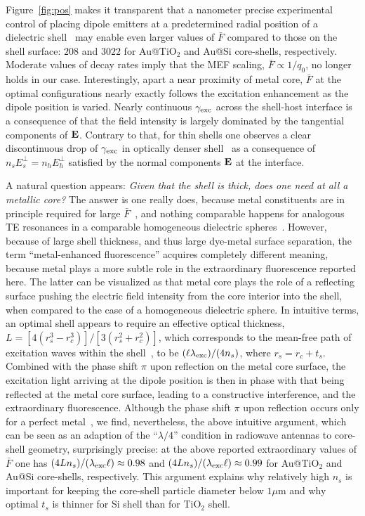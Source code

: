 \documentclass[9pt,twocolumn,twoside]{osajnl}
\newcommand{\vE}{{\bf E}}
\newcommand{\ld}{\lambda}
\begin{document}
Figure~\ref{fig:pos} makes it transparent that a nanometer precise experimental control of placing dipole emitters at a predetermined radial position of a dielectric shell~\cite{VanBlaaderen1992} may enable even larger values of $\bar F$ compared to those on the shell surface: $208$ and $3022$ for Au@TiO$_2$ and Au@Si core-shells, respectively. 
Moderate values of decay rates imply that the MEF scaling, $\bar F\propto 1/q_0$, no longer holds in our case. 
Interestingly, apart a near proximity of metal core, $\bar F$ at the optimal configurations nearly exactly follows the excitation enhancement as the dipole position is varied. 
Nearly continuous $\gamma_{\rm exc}$ across the shell-host interface is a consequence of that the field intensity is largely dominated by the tangential components of $\vE$. Contrary to that, for thin shells one observes a clear discontinuous drop of $\gamma_{\rm exc}$ in optically denser shell~\cite[Fig. S1]{Sun20JPCC} as a consequence of $n_s E_s^\perp=n_h E_h^\perp$ satisfied by the normal components $\vE$ at the interface. 

A natural question appears: {\em Given that the shell is thick, does one need at all a metallic core?} The answer is one really does, because metal constituents are in principle required for large $\bar F$~\cite{Bozhevolnyi2016}, and nothing comparable happens for analogous TE resonances in a comparable homogeneous dielectric spheres~\cite{DeDood2001a}. 
However, because of large shell thickness, and thus large dye-metal surface separation,
the term ``metal-enhanced fluorescence'' acquires completely different meaning, because metal plays a more subtle role in the extraordinary fluorescence reported here. 
The latter can be visualized as that metal core plays the role of a reflecting surface pushing the electric field intensity from the core interior into the shell, when compared to the case of a homogeneous dielectric sphere. 
In intuitive terms, an optimal shell appears to require an effective optical thickness, $L=[4(r_s^3 - r_c^3)] /[3(r_s^2 + r_c^2)]$, which corresponds to the mean-free path of excitation waves within the shell~\cite{Moroz2008}, to be $(\ell \ld_{\rm exc})/(4n_s)$, where $r_s = r_c + t_s$.
Combined with the phase shift $\pi$ upon reflection on the metal core surface, the excitation light arriving at the dipole position is then in phase with that being reflected at the metal core surface, leading to a constructive interference, and the extraordinary fluorescence.
Although the phase shift $\pi$ upon reflection occurs only for a perfect metal~\cite{Doi1997}, we find, nevertheless, the above intuitive argument, which can be seen as an adaption of the ``$\ld/4$'' condition in radiowave antennas to core-shell geometry, surprisingly precise: at the above reported extraordinary values of $\bar F$ one has $(4Ln_s)/(\ld_{\rm exc}\ell) \approx 0.98$ and $(4Ln_s)/(\ld_{\rm exc}\ell) \approx 0.99$ for Au@TiO$_2$ and Au@Si core-shells, respectively.
This argument explains why relatively high $n_s$ is important for keeping the core-shell particle diameter below $1 \mu$m and why optimal $t_s$ is thinner for Si shell than for TiO$_2$ shell.
\end{document}
